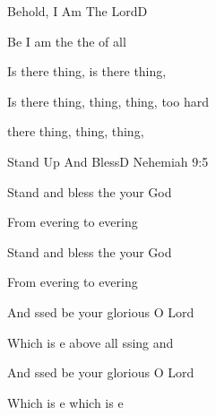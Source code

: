 \documentclass[12pt]{book}
\newcommand{\RevDate}{\today}
\newcommand{\NotCCLIed}{\relax}
\begin{document}
\begin{song}{Behold, I Am The Lord}{D}
  {}
  {}
  {}
  {\NotCCLIed}

  \renewcommand{\RevDate}{February~11,~1993}

  \begin{SBOpGroup}
    Be I am the  the  of all 
    
    Is there thing, is there thing,    
    
    Is there thing, thing, thing, too hard  
    
     there thing, thing, thing,    
  \end{SBOpGroup}
\end{song}


\begin{song}{Stand Up And Bless}{D}
  {}
  {}
  {Nehemiah 9:5}
  {\NotCCLIed}

  \renewcommand{\RevDate}{February~11,~1993}

  \begin{SBOpGroup}
    Stand  and bless the  your God
    
    From evering to evering
    
    Stand  and bless the  your God
    
    From evering to evering
  \end{SBOpGroup}

\WBPageBrk
  \begin{SBChorus}
    And ssed be your glorious  O Lord

    Which is e above all ssing and 

    And ssed be your glorious  O Lord

    Which is e which is e
  \end{SBChorus}
\end{song}
\end{document}
